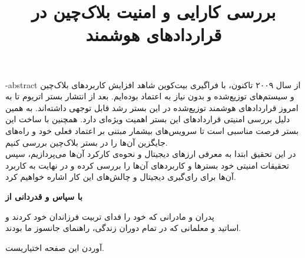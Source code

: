 \documentclass[oneside,openany,mscS]{SBU-Thesis}
\begin{document}
	\title{بررسی کارایی و امنیت بلاک‌چین در قرار‌داد‌های هوشمند}
	
	\subject{مهندسی کامپیوتر}
	
	
	
	
	


	
	
	
	\fa-abstract{	
		از سال ۲۰۰۹ تاکنون، با فراگیری بیت‌‌کوین شاهد افزایش ‌کاربرد‌های بلاک‌چین و سیستم‌های توزیع‌شده و بدون نیاز به اعتماد بوده‌ایم. بعد از انتشار بستر اتریوم تا به امروز قرار‌داد‌های هوشمند توزیع‌شده در این بستر رشد قابل توجهی داشته‌اند. به همین دلیل بررسی امنیتی قرار‌داد‌های این بستر اهمیت ویژه‌ای دارد. همچنین با ساخت این بستر فرصت مناسبی است تا سرویس‌های بیشمار مبتنی بر اعتماد فعلی خود و راه‌های جایگزین آن‌ها را در بستر بلاک‌چین بررسی کنیم.
		\\
		در این تحقیق ابتدا به معرفی ارز‌های دیجیتال و نحوه‌ی کارکرد آن‌ها می‌پردازیم، سپس تحقیقات امنیتی خود بسترها و کاربرد‌های آن‌ها را بررسی کرده و در نهایت به کاربرد آن‌ها برای رای‌گیری دیجیتال و چالش‌های این کار اشاره خواهیم کرد. 
	}
	
\firstPage %
\davaranPage %

{
	\newpage
	\thispagestyle{plain}
	\noindent
	\large{\textbf{با سپاس و قدردانی از}}
	
	\noindent
	پدران و مادرانی که خود را فدای تربیت فرزاندان خود کردند و\\
	اساتید و معلمانی که در تمام دوران زندگی، راهنمای جانسوز ما بودند.
	
	
	\vspace{14cm}	
	آوردن این صفحه اختیاریست.
	
	\pagebreak
}
\end{document}

